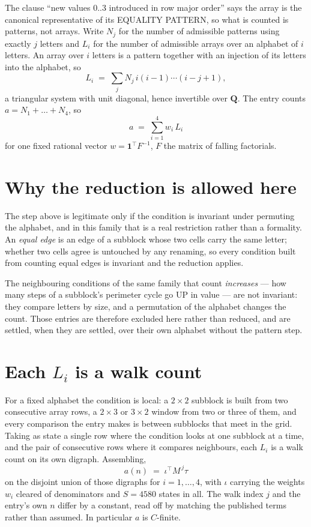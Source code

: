 \documentclass[11pt,a4paper]{article}
\theoremstyle{plain}
\theoremstyle{definition}
\begin{document}
The clause ``new values $0..3$ introduced in row major order'' says the array is the
canonical representative of its EQUALITY PATTERN, so what is counted is patterns, not arrays.
Write $N_j$ for the number of admissible patterns using exactly $j$ letters and $L_i$ for the
number of admissible arrays over an alphabet of $i$ letters. An array over $i$ letters is a
pattern together with an injection of its letters into the alphabet, so
\[
L_i\;=\;\sum_j N_j\,i(i-1)\cdots(i-j+1),
\]
a triangular system with unit diagonal, hence invertible over $\mathbf{Q}$. The entry counts
$a=N_1+\dots+N_{4}$, so
\[
a\;=\;\sum_{i=1}^{4}w_i\,L_i
\]
for one fixed rational vector $w=\mathbf{1}^{\!\top}F^{-1}$, $F$ the matrix of falling
factorials.

\section{Why the reduction is allowed here}

The step above is legitimate only if the condition is invariant under permuting the alphabet,
and in this family that is a real restriction rather than a formality. An \emph{equal edge}
is an edge of a subblock whose two cells carry the same letter; whether two cells agree is
untouched by any renaming, so every condition built from counting equal edges is invariant and
the reduction applies.

The neighbouring conditions of the same family that count \emph{increases} --- how many steps
of a subblock's perimeter cycle go UP in value --- are not invariant: they compare letters by
size, and a permutation of the alphabet changes the count. Those entries are therefore excluded
here rather than reduced, and are settled, when they are settled, over their own alphabet
without the pattern step.

\section{Each $L_i$ is a walk count}

For a fixed alphabet the condition is local: a $2\times2$ subblock is built from two
consecutive array rows, a $2\times3$ or $3\times2$ window from two or three of them, and every
comparison the entry makes is between subblocks that meet in the grid. Taking as state a single
row where the condition looks at one subblock at a time, and the pair of consecutive rows where
it compares neighbours, each $L_i$ is a walk count on its own digraph. Assembling,
\[
a(n)\;=\;\iota^{\!\top}M^{\,j}\tau
\]
on the disjoint union of those digraphs for $i=1,\dots,4$, with $\iota$ carrying the weights
$w_i$ cleared of denominators and $S=4580$ states in all. The walk index $j$ and the entry's own
$n$ differ by a constant, read off by matching the published terms rather than assumed. In
particular $a$ is $C$-finite.
\end{document}
